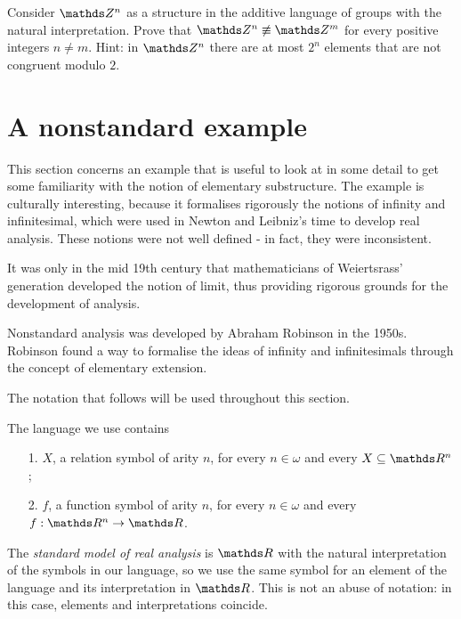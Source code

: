 \begin{exercise}\label{ex_Z^nZ^m_nonelementary}
Consider $\ZZ^n$ as a structure in the additive language of groups with the natural interpretation.
Prove that $\ZZ^n\not\equiv\ZZ^m$ for every positive integers $n\neq m$.
Hint: in $\ZZ^n$ there are at most $2^n$ elements that are not congruent modulo $2$.
\end{exercise}


\section{A nonstandard example}
\label{nonstandard}
\def\nsR{{}^*\kern-.2ex\RR}
\def\nsN{{}^*\kern-.2ex\NN}
\def\nsQ{{}^*\kern-.2ex\QQ}
\def\ns{{}^*\kern-.2ex}
\def\st{{\rm st}}

This section concerns an example that is useful to look at in some detail to get some familiarity with the notion of elementary substructure.
The example is culturally interesting, because it formalises rigorously the notions of infinity and infinitesimal, which were used in Newton and Leibniz's time to develop real analysis.
These notions were not well defined - in fact, they were inconsistent.

It was only in the mid 19th century that mathematicians of Weiertsrass' generation developed the notion of limit, thus providing rigorous grounds for the development of analysis.

Nonstandard analysis was developed by Abraham Robinson in the 1950s.
Robinson found a way to formalise the ideas of infinity and infinitesimals through the concept of elementary extension.

The notation that follows will be used throughout this section.

The language we use contains
\begin{itemize}
\item[1.] $X$, a relation symbol of arity $n$, for every $n\in\omega$ and every $X\subseteq \RR^n$;
\item[2.] $f$, a function symbol of arity $n$, for every $n\in\omega$ and every  $f:\RR^n\imp\RR$.
\end{itemize}
The \emph{standard model of real analysis} is $\RR$ with the natural interpretation of the symbols in our language, so we use the same symbol for an element of the language and its interpretation in $\RR$.
This is not an abuse of notation: in this case, elements and interpretations coincide.

